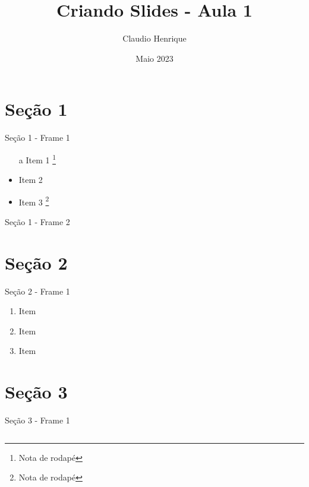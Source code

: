 \documentclass[aspectratio=149]{beamer}
\title{Criando Slides - Aula 1}
\author{Claudio Henrique}
\date{Maio 2023}
\begin{document}
\maketitle

\begin{frame}
	\tableofcontents %
\end{frame}

\section{Seção 1}
	\begin{frame}{Seção 1 - Frame 1}
		\begin{itemize}
			\item[a] Item 1 \footnote{Nota de rodapé}
			\item Item 2
			\item Item 3 \footnote[9]{Nota de rodapé}
		\end{itemize}
	\end{frame}
	
	\begin{frame}{Seção 1 - Frame 2}
		\lipsum[1-1]
	\end{frame}

\section{Seção 2}

	\begin{frame}{Seção 2 - Frame 1}
		\begin{enumerate} [<+- | alert@+>] %
			\item Item
			\item Item
			\item Item
		\end{enumerate}
	\end{frame}
	
\section{Seção 3}
	\begin{frame}{Seção 3 - Frame 1}
		\begin{columns}
			\lipsum[1-1]
			
			\lipsum[1-1]
		\end{columns}
	\end{frame}
\end{document}
